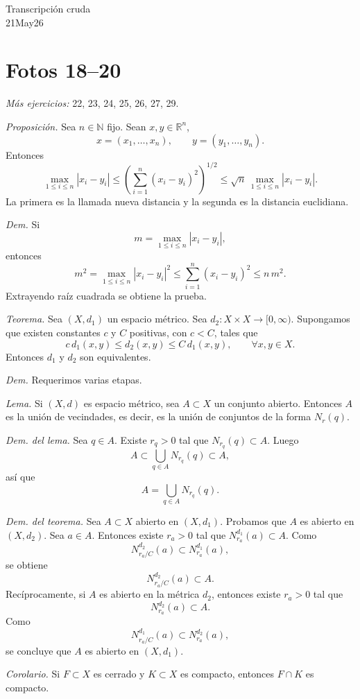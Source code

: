 \documentclass[12pt]{article}
\begin{document}
\begin{center}
{\Large Transcripción cruda}\\[2mm]
{\large 21May26}
\end{center}

\section*{Fotos 18--20}

\textit{Más ejercicios:} 22, 23, 24, 25, 26, 27, 29.

\textit{Proposición.} Sea $n\in\mathbb N$ fijo. Sean $x,y\in\mathbb R^n$,
\[
x=(x_1,\dots,x_n),\qquad y=(y_1,\dots,y_n).
\]
Entonces
\[
\max_{1\le i\le n}|x_i-y_i|
\le
\left(\sum_{i=1}^n (x_i-y_i)^2\right)^{1/2}
\le
\sqrt n\,\max_{1\le i\le n}|x_i-y_i|.
\]
La primera es la llamada nueva distancia y la segunda es la distancia euclidiana.

\textit{Dem.} Si
\[
m=\max_{1\le i\le n}|x_i-y_i|,
\]
entonces
\[
m^2=\max_{1\le i\le n}|x_i-y_i|^2
\le \sum_{i=1}^n (x_i-y_i)^2
\le n\,m^2.
\]
Extrayendo raíz cuadrada se obtiene la prueba.

\textit{Teorema.} Sea $(X,d_1)$ un espacio métrico. Sea $d_2:X\times X\to[0,\infty)$.
Supongamos que existen constantes $c$ y $C$ positivas, con $c<C$, tales que
\[
c\,d_1(x,y)\le d_2(x,y)\le C\,d_1(x,y),\qquad \forall x,y\in X.
\]
Entonces $d_1$ y $d_2$ son equivalentes.

\textit{Dem.} Requerimos varias etapas.

\textit{Lema.} Si $(X,d)$ es espacio métrico, sea $A\subset X$ un conjunto abierto. Entonces $A$ es la unión de vecindades, es decir, es la unión de conjuntos de la forma $N_r(q)$.

\textit{Dem. del lema.} Sea $q\in A$. Existe $r_q>0$ tal que $N_{r_q}(q)\subset A$.
Luego
\[
A\subset \bigcup_{q\in A} N_{r_q}(q)\subset A,
\]
así que
\[
A=\bigcup_{q\in A} N_{r_q}(q).
\]

\textit{Dem. del teorema.} Sea $A\subset X$ abierto en $(X,d_1)$. Probamos que $A$ es abierto en $(X,d_2)$.
Sea $a\in A$. Entonces existe $r_a>0$ tal que $N_{r_a}^{d_1}(a)\subset A$.
Como
\[
N_{r_a/C}^{d_2}(a)\subset N_{r_a}^{d_1}(a),
\]
se obtiene
\[
N_{r_a/C}^{d_2}(a)\subset A.
\]
Recíprocamente, si $A$ es abierto en la métrica $d_2$, entonces existe $r_a>0$ tal que
\[
N_{r_a}^{d_2}(a)\subset A.
\]
Como
\[
N_{r_a/C}^{d_1}(a)\subset N_{r_a}^{d_2}(a),
\]
se concluye que $A$ es abierto en $(X,d_1)$.

\textit{Corolario.} Si $F\subset X$ es cerrado y $K\subset X$ es compacto, entonces $F\cap K$ es compacto.
\end{document}
